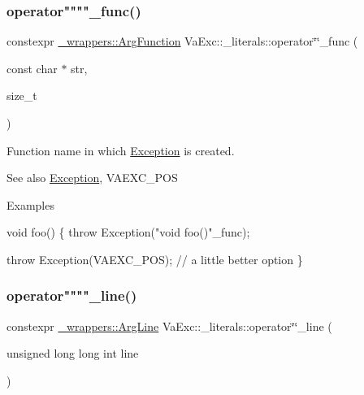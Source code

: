 \subsubsection{\texorpdfstring{operator""""\+\_\+func()}{operator""\_func()}}
{\footnotesize\ttfamily constexpr \hyperlink{struct_va_exc_1_1__wrappers_1_1_arg_function}{\+\_\+wrappers\+::\+Arg\+Function} Va\+Exc\+::\+\_\+literals\+::operator\char`\"{}\char`\"{}\+\_\+func (\begin{DoxyParamCaption}\item[{const char $\ast$}]{str,  }\item[{size\+\_\+t}]{ }\end{DoxyParamCaption})\hspace{0.3cm}{\ttfamily [noexcept]}}



Function name in which \hyperlink{class_va_exc_1_1_exception}{Exception} is created. 

\begin{DoxySeeAlso}{See also}
\hyperlink{class_va_exc_1_1_exception}{Exception}, V\+A\+E\+X\+C\+\_\+\+P\+OS 
\end{DoxySeeAlso}
\begin{DoxyParagraph}{Examples}

\begin{DoxyCode}
\textcolor{keywordtype}{void} foo()
\{
    \textcolor{keywordflow}{throw} Exception(\textcolor{stringliteral}{"void foo()"}\_func);

    \textcolor{keywordflow}{throw} Exception(VAEXC\_POS);  \textcolor{comment}{// a little better option}
\}
\end{DoxyCode}
 
\end{DoxyParagraph}
\mbox{\label{namespace_va_exc_1_1__literals_a3dbcc12c461e252ba8a515078da4eabe}} 
\subsubsection{\texorpdfstring{operator""""\+\_\+line()}{operator""\_line()}}
{\footnotesize\ttfamily constexpr \hyperlink{struct_va_exc_1_1__wrappers_1_1_arg_line}{\+\_\+wrappers\+::\+Arg\+Line} Va\+Exc\+::\+\_\+literals\+::operator\char`\"{}\char`\"{}\+\_\+line (\begin{DoxyParamCaption}\item[{unsigned long long int}]{line }\end{DoxyParamCaption})\hspace{0.3cm}{\ttfamily [noexcept]}}



